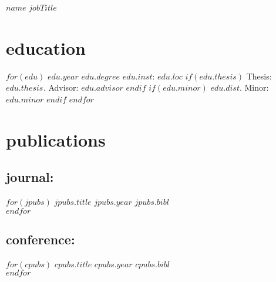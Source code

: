 \documentclass[]{friggeri-cv}
\begin{document}
\header
  {$name$}
  {$jobTitle$}






\section{education}
\begin{entrylist}
$for(edu)$
  \entry
  {$edu.year$}
  {$edu.degree$}
  {$edu.inst$: $edu.loc$}
  $if(edu.thesis)$
    {Thesis: \textit{$edu.thesis$.} Advisor: $edu.advisor$}
  $endif$
  $if(edu.minor)$
    {$edu.dist$. Minor: $edu.minor$}
  $endif$
$endfor$
\end{entrylist}



\section{publications}

\subsection{journal:}
\begin{entrylist}
$for(jpubs)$
  \entrypub
  {$jpubs.title$}
  {$jpubs.year$}
  {$jpubs.bibl$}\\
$endfor$
\end{entrylist}

\subsection{conference:}
\begin{entrylist}
$for(cpubs)$
  \entrypub
  {$cpubs.title$}
  {$cpubs.year$}
  {$cpubs.bibl$}\\
$endfor$
\end{entrylist}
\end{document}
